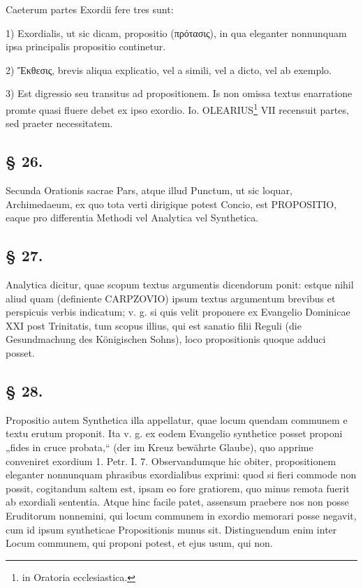 Caeterum partes Exordii fere tres sunt:

1) Exordialis, ut sic dicam, propositio (πρότασις), in qua eleganter nonnunquam ipsa principalis propositio continetur.

2) Ἔκθεσις, brevis aliqua explicatio, vel a simili, vel a dicto, vel ab exemplo.

3) Est digressio seu transitus ad propositionem. Is non omissa textus enarratione promte quasi fluere
debet ex ipso exordio. Io. OLEARIUS\footnote{in Oratoria ecclesiastica.} VII recensuit partes, sed praeter necessitatem.

\subsection*{§ 26.}

Secunda Orationis sacrae Pars, atque illud Punctum, ut sic loquar, Archimedaeum, ex quo tota verti dirigique potest Concio, est PROPOSITIO, eaque pro differentia Methodi vel Analytica vel Synthetica.

\subsection*{§ 27.}

Analytica dicitur, quae scopum textus argumentis dicendorum ponit: estque nihil aliud quam (definiente CARPZOVIO) ipsum textus argumentum brevibus et perspicuis verbis indicatum; v. g. si quis velit proponere ex Evangelio Dominicae XXI post Trinitatis, tum scopus illius, qui est sanatio filii Reguli (die Gesundmachung des Königischen Sohns), loco propositionis quoque adduci posset.

\subsection*{§ 28.}

Propositio autem Synthetica illa appellatur, quae locum quendam communem e textu erutum proponit. Ita v. g. ex eodem Evangelio synthetice posset proponi „fides in cruce probata,“ (der im Kreuz bewährte Glaube), quo apprime conveniret exordium 1. Petr. I. 7. Observandumque hic obiter, propositionem eleganter nonnunquam phrasibus exordialibus exprimi: quod si fieri commode non possit, cogitandum saltem est, ipsam eo fore gratiorem, quo minus remota fuerit ab exordiali sententia. Atque hinc facile patet, assensum praebere nos non posse Eruditorum nonnemini, qui locum communem in exordio memorari posse negavit, cum id ipsum
syntheticae Propositionis munus sit. Distinguendum enim inter Locum communem, qui proponi potest, et ejus usum, qui non.

